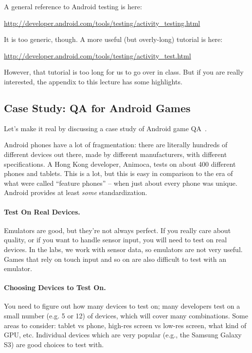 A general reference to Android testing is here:

\begin{center}
{\url{http://developer.android.com/tools/testing/activity_testing.html}}
\end{center}

It is too generic, though. A more useful (but overly-long) tutorial is here:

\begin{center}
{\url{http://developer.android.com/tools/testing/activity_test.html}}
\end{center}

However, that tutorial is too long for us to go over in class. But if you are really interested, the appendix to this lecture has some highlights.


\subsection*{Case Study: QA for Android Games}
Let's make it real by discussing a case study of Android game QA~\cite{techcrunch}.

Android phones have a lot of fragmentation: there are literally hundreds of different devices out there, made by different manufacturers, with different specifications. A Hong Kong developer, Animoca, tests on about 400 different phones and tablets. This is a lot, but this is easy in comparison to the era of what were called ``feature phones'' -- when just about every phone was unique. Android provides at least \emph{some} standardization.

\paragraph{Test On Real Devices.} Emulators are good, but they're not always perfect. 
If you really care about quality, or if you want to handle sensor input, you will need
to test on real devices. In the labs, we work with sensor data, so emulators are not very useful. Games that rely on touch input and so on are also difficult to test with an emulator. 

\paragraph{Choosing Devices to Test On.} You need to figure out how many devices to test on; many developers test on a small number (e.g. 5 or 12) of devices, which will cover many combinations. Some areas to consider: tablet vs phone, high-res screen vs low-res screen, what kind of GPU, etc. Individual devices which are very popular (e.g., the Samsung Galaxy S3) are good choices to test with.


